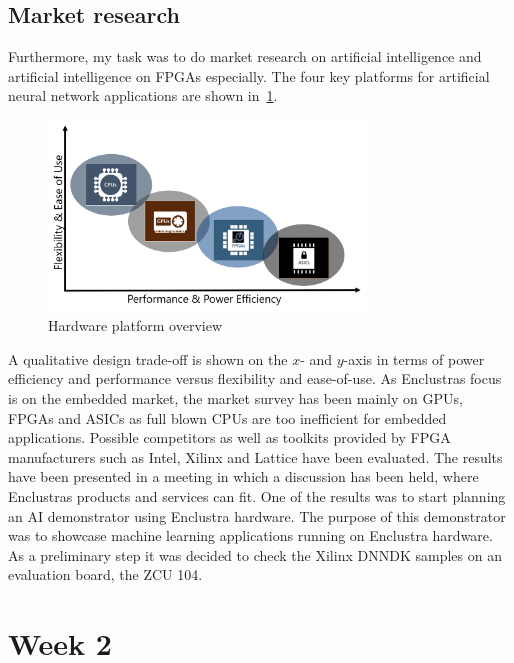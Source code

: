 \subsection{Market research}
Furthermore, my task was to do market research on artificial intelligence and artificial intelligence on \acp{FPGA} especially. The four key platforms for artificial neural network applications are shown in~\ref{fig:overview}.
\begin{figure}[!htb]
	\centering
		\includegraphics[width=0.75\textwidth]{bilder/overview.png}
		\caption{Hardware platform overview}
		\label{fig:overview}
\end{figure}
A qualitative design trade-off is shown on the $x$- and $y$-axis in terms of power efficiency and performance versus flexibility and ease-of-use. As Enclustras focus is on the embedded market, the market survey has been mainly on \acp{GPU}, \acp{FPGA} and \acp{ASIC} as full blown \acp{CPU} are too inefficient for embedded applications. Possible competitors as well as toolkits provided by \ac{FPGA} manufacturers such as Intel, Xilinx and Lattice have been evaluated. The results have been presented in a meeting in which a discussion has been held, where Enclustras products and services can fit. One of the results was to start planning an \ac{AI} demonstrator using Enclustra hardware. The purpose of this demonstrator was to showcase machine learning applications running on Enclustra hardware. As a preliminary step it was decided to check the Xilinx \ac{DNNDK} samples on an evaluation board, the ZCU 104.

\section{Week 2}
